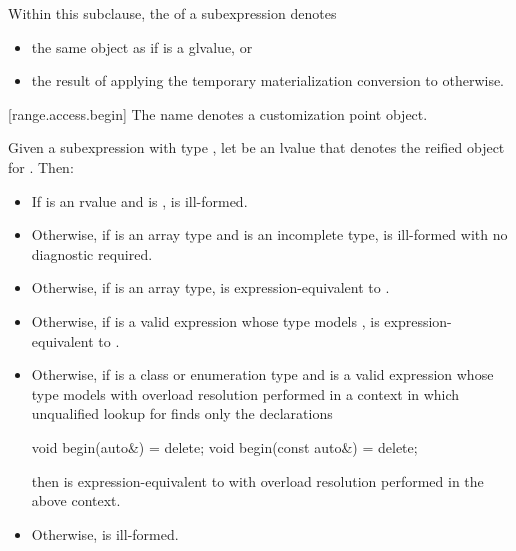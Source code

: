 \pnum
Within this subclause,
the  of a subexpression  denotes
\begin{itemize}
\item
the same object as  if  is a glvalue, or
\item
the result of applying
the temporary materialization conversion to  otherwise.
\end{itemize}

[range.access.begin]{}
\pnum
The name  denotes a customization point
object.

\pnum
Given a subexpression  with type ,
let  be an lvalue that denotes the reified object for .
Then:

\begin{itemize}
\item
  If  is an rvalue and
   is ,
   is ill-formed.

\item
  Otherwise, if  is an array type and
   is an incomplete type,
   is ill-formed with no diagnostic required.

\item
  Otherwise, if  is an array type,
   is expression-equivalent to .

\item
  Otherwise, if 
  is a valid expression whose type models
  ,
   is expression-equivalent to
  .

\item
  Otherwise, if  is a class or enumeration type and
  is a valid expression whose type models
  with overload resolution performed in a context in which
  unqualified lookup for  finds only the declarations
\begin{codeblock}
void begin(auto&) = delete;
void begin(const auto&) = delete;
\end{codeblock}
  then  is expression-equivalent to
  with overload resolution performed in the above context.

\item
  Otherwise,  is ill-formed.
\end{itemize}

